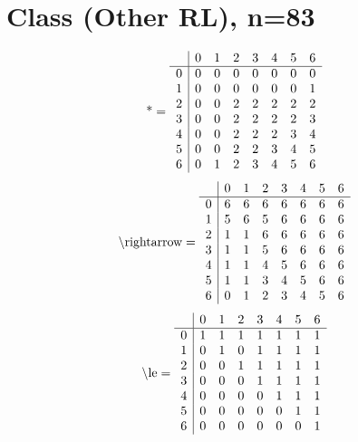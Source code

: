 \documentclass[11pt]{article}
\begin{document}
\section{Class (Other RL), n=83}
\[\text{*} = 
\begin{array}{r | r r r r r r r}
 & 0 & 1 & 2 & 3 & 4 & 5 & 6 \\ \hline
0 & 0 & 0 & 0 & 0 & 0 & 0 & 0 \\
1 & 0 & 0 & 0 & 0 & 0 & 0 & 1 \\
2 & 0 & 0 & 2 & 2 & 2 & 2 & 2 \\
3 & 0 & 0 & 2 & 2 & 2 & 2 & 3 \\
4 & 0 & 0 & 2 & 2 & 2 & 3 & 4 \\
5 & 0 & 0 & 2 & 2 & 3 & 4 & 5 \\
6 & 0 & 1 & 2 & 3 & 4 & 5 & 6 \\
\end{array}
\]
\[\text{\textbackslash rightarrow} = 
\begin{array}{r | r r r r r r r}
 & 0 & 1 & 2 & 3 & 4 & 5 & 6 \\ \hline
0 & 6 & 6 & 6 & 6 & 6 & 6 & 6 \\
1 & 5 & 6 & 5 & 6 & 6 & 6 & 6 \\
2 & 1 & 1 & 6 & 6 & 6 & 6 & 6 \\
3 & 1 & 1 & 5 & 6 & 6 & 6 & 6 \\
4 & 1 & 1 & 4 & 5 & 6 & 6 & 6 \\
5 & 1 & 1 & 3 & 4 & 5 & 6 & 6 \\
6 & 0 & 1 & 2 & 3 & 4 & 5 & 6 \\
\end{array}
\]
\[\text{\textbackslash le} = 
\begin{array}{r | r r r r r r r}
 & 0 & 1 & 2 & 3 & 4 & 5 & 6 \\ \hline
0 & 1 & 1 & 1 & 1 & 1 & 1 & 1 \\
1 & 0 & 1 & 0 & 1 & 1 & 1 & 1 \\
2 & 0 & 0 & 1 & 1 & 1 & 1 & 1 \\
3 & 0 & 0 & 0 & 1 & 1 & 1 & 1 \\
4 & 0 & 0 & 0 & 0 & 1 & 1 & 1 \\
5 & 0 & 0 & 0 & 0 & 0 & 1 & 1 \\
6 & 0 & 0 & 0 & 0 & 0 & 0 & 1 \\
\end{array}
\]
\end{document}

